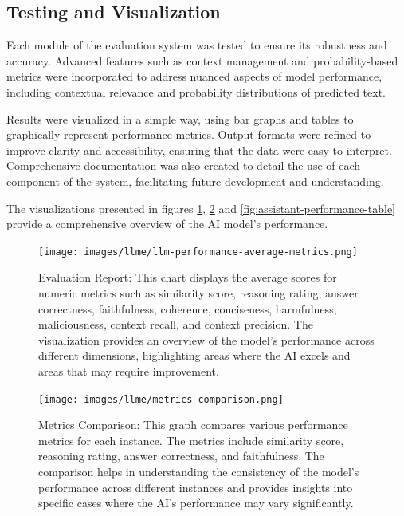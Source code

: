 \subsection{Testing and Visualization}

Each module of the evaluation system was tested to ensure its robustness and accuracy. Advanced features such as context management and probability-based metrics were incorporated to address nuanced aspects of model performance, including contextual relevance and probability distributions of predicted text.

Results were visualized in a simple way, using bar graphs and tables to graphically represent performance metrics. Output formats were refined to improve clarity and accessibility, ensuring that the data were easy to interpret. Comprehensive documentation was also created to detail the use of each component of the system, facilitating future development and understanding.

The visualizations presented in figures \ref{fig:llm-performance-average-metrics}, \ref{fig:metrics-comparison} and \ref{fig:assistant-performance-table} provide a comprehensive overview of the AI model's performance.

\begin{figure}[h!]
    \centering
    \texttt{[image: images/llme/llm-performance-average-metrics.png]}
    \caption{Evaluation Report: This chart displays the average scores for numeric metrics such as similarity score, reasoning rating, answer correctness, faithfulness, coherence, conciseness, harmfulness, maliciousness, context recall, and context precision. The visualization provides an overview of the model's performance across different dimensions, highlighting areas where the AI excels and areas that may require improvement.}
    \label{fig:llm-performance-average-metrics}
\end{figure}

\begin{figure}[h!]
    \centering
    \texttt{[image: images/llme/metrics-comparison.png]}
    \caption{Metrics Comparison: This graph compares various performance metrics for each instance. The metrics include similarity score, reasoning rating, answer correctness, and faithfulness. The comparison helps in understanding the consistency of the model's performance across different instances and provides insights into specific cases where the AI's performance may vary significantly.}
    \label{fig:metrics-comparison}
\end{figure}

